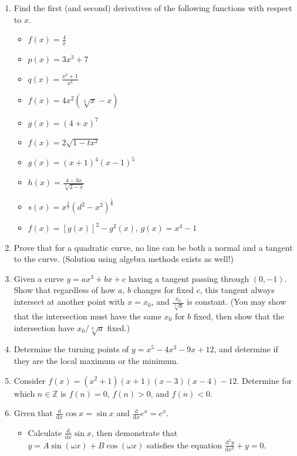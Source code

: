 \documentclass{article}
\newcommand{\prestar}{\vspace*{0.3em}\hspace*{\fill}}
\newcommand{\onestar}{\marginpar{\prestar\textcolor{red}{$\ast$}}}
\begin{document}
\begin{enumerate}
\item Find the first (and second) derivatives of the following functions with respect to $x$.
        \begin{itemize}
              \item[(a)] $f(x)=\frac 4x$
              \item[(b)] $p(x)=3x^3+7$
              \item[(c)] $q(x)=\frac{x^3+1}{x^2}$
              \item[(d)] $f(x)=4x^2(\sqrt[3]{x}-x)$
              \item[(e)] $g(x)=(4+x)^7$
              \item[(f)] $f(x)=2\sqrt{1-tx^2}$
              \item[(g)] $g(x)=(x+1)^4(x-1)^5$
              \item[(h)] $h(x)=\frac{4-3x}{\sqrt[3]{2-x}}$
              \item[(i)] $s(x)=x^{\frac 23}(d^2-x^2)^{\frac 16}$
              \item[(j)] $f(x)=[g(x)]^2-g^2(x)$, $g(x)=x^4-1$
       \end{itemize}
\item Prove that for a quadratic curve, no line can be both a normal and a tangent to the curve. (Solution using algebra methods exists as well!)
\item \onestar Given a curve $y=ax^3+bx+c$ having a tangent passing through $(0,-1)$. Show that regardless of how $a$, $b$ changes for fixed $c$, this tangent always intersect at another point with $x=x_0$, and $\frac{x_0}{\sqrt[3]{a}}$ is constant. (You may show that the intersection must have the same $x_0$ for $b$ fixed, then show that the intersection have $x_0/\sqrt[3]{a}$ fixed.)
\item Determine the turning points of $y=x^{5}-4x^{3}-9x+12$, and determine if they are the local maximum or the minimum.
\item Consider $f(x)=(x^2+1)(x+1)(x-3)(x-4)-12$. Determine for which $n\in\mathbb{Z}$ is $f(n)=0$, $f(n)>0$, and $f(n)<0$.
\item \onestar Given that $\displaystyle \frac{\mathrm d}{\mathrm dx}\cos x=\sin x$ and $\displaystyle \frac{\mathrm d}{\mathrm dx}e^x=e^x$.
       \begin{itemize}
              \item[(a)] Calculate $\displaystyle \frac{\mathrm d}{\mathrm dx}\sin x$, then demonstrate that $y=A\sin(\omega x)+B\cos(\omega x)$ satisfies the equation $\displaystyle \frac{\mathrm d^2y}{\mathrm dx^2}+y=0$.

\end{itemize}
\end{enumerate}
\end{document}
